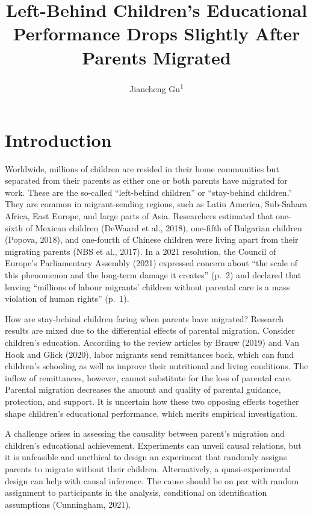 \documentclass[
  man,floatsintext]{apa7}
\title{Left-Behind Children's Educational Performance Drops Slightly After Parents Migrated}
\author{Jiancheng Gu\textsuperscript{1}}
\date{}
\affiliation{\vspace{0.5cm}\textsuperscript{1} Faculty of Social Sciences, Vrije Universiteit Amsterdam}
\begin{document}
\maketitle

\hypertarget{introduction}{%
\section{Introduction}\label{introduction}}

Worldwide, millions of children are resided in their home communities but separated from their parents as either one or both parents have migrated for work. These are the so-called ``left-behind children'' or ``stay-behind children.'' They are common in migrant-sending regions, such as Latin America, Sub-Sahara Africa, East Europe, and large parts of Asia. Researchers estimated that one-sixth of Mexican children (DeWaard et al., 2018), one-fifth of Bulgarian children (Popova, 2018), and one-fourth of Chinese children were living apart from their migrating parents (NBS et al., 2017). In a 2021 resolution, the Council of Europe's Parliamentary Assembly (2021) expressed concern about ``the scale of this phenomenon and the long-term damage it creates'' (p.~2) and declared that leaving ``millions of labour migrants' children without parental care is a mass violation of human rights'' (p.~1).

How are stay-behind children faring when parents have migrated? Research results are mixed due to the differential effects of parental migration. Consider children's education. According to the review articles by Brauw (2019) and Van Hook and Glick (2020), labor migrants send remittances back, which can fund children's schooling as well as improve their nutritional and living conditions. The inflow of remittances, however, cannot substitute for the loss of parental care. Parental migration decreases the amount and quality of parental guidance, protection, and support. It is uncertain how these two opposing effects together shape children's educational performance, which merits empirical investigation.

A challenge arises in assessing the causality between parent's migration and children's educational achievement. Experiments can unveil causal relations, but it is unfeasible and unethical to design an experiment that randomly assigns parents to migrate without their children. Alternatively, a quasi-experimental design can help with causal inference. The cause should be on par with random assignment to participants in the analysis, conditional on identification assumptions (Cunningham, 2021).
\end{document}
